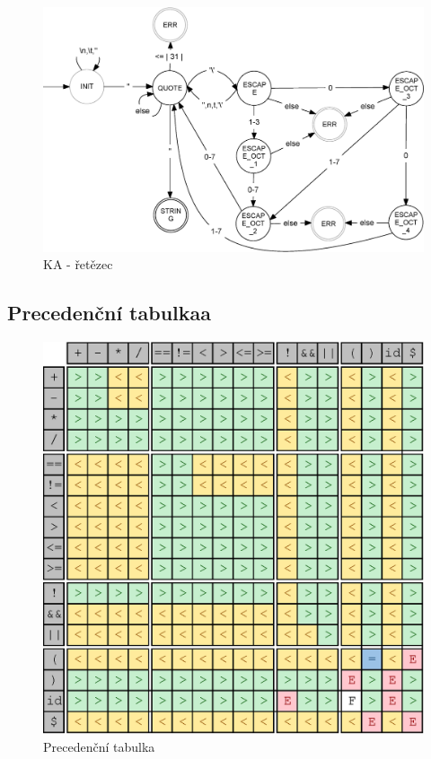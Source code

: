 \documentclass[a4paper,11pt]{article}
\begin{document}
\newpage
\begin{figure}[H]
	\centering
	\includegraphics[scale=.31]{FSM_STRING.eps}
	\caption{KA - řetězec}
\end{figure}

\subsection{Precedenční tabulkaa}
\begin{figure}[H]
   \centering
   \includegraphics[]{precedence_tab.eps}
   \caption{Precedenční tabulka}
\end{figure}
\end{document}
